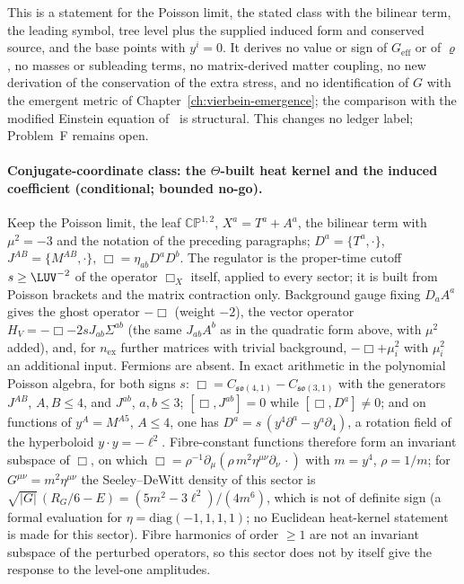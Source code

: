 This is a statement for the Poisson limit, the stated class with the bilinear term, the leading symbol, tree level plus the supplied induced form and conserved source, and the base points with \(y^i=0\). It derives no value or sign of \(G_{\mathrm{eff}}\) or of \(\varrho\), no masses or subleading terms, no matrix-derived matter coupling, no new derivation of the conservation of the extra stress, and no identification of \(G\) with the emergent metric of Chapter~\ref{ch:vierbein-emergence}; the comparison with the modified Einstein equation of~\cite{KumarSteinacker2023,Steinacker2026} is structural. This changes no ledger label; Problem~F remains open.

\paragraph{Conjugate-coordinate class: the \(\Theta\)-built heat kernel and the induced coefficient (conditional; bounded no-go).}
Keep the Poisson limit, the leaf \(\mathbb{CP}^{1,2}\), \(X^a=T^a+A^a\), the bilinear term with \(\mu^2=-3\) and the notation of the preceding paragraphs; \(D^a=\{T^a,\cdot\}\), \(J^{AB}=\{M^{AB},\cdot\}\), \(\Box=\eta_{ab}D^aD^b\). The regulator is the proper-time cutoff \(s\ge\LUV^{-2}\) of the operator \(\Box_X\) itself, applied to every sector; it is built from Poisson brackets and the matrix contraction only. Background gauge fixing \(D_aA^a\) gives the ghost operator \(-\Box\) (weight \(-2\)), the vector operator \(H_V=-\Box-2sJ_{ab}\Sigma^{ab}\) (the same \(J_{ab}A^b\) as in the quadratic form above, with \(\mu^2\) added), and, for \(n_{\mathrm{ex}}\) further matrices with trivial background, \(-\Box+\mu_i^2\) with \(\mu_i^2\) an additional input. Fermions are absent. In exact arithmetic in the polynomial Poisson algebra, for both signs \(s\): \(\Box=C_{\mathfrak{so}(4,1)}-C_{\mathfrak{so}(3,1)}\) with the generators \(J^{AB}\), \(A,B\le4\), and \(J^{ab}\), \(a,b\le3\); \([\Box,J^{ab}]=0\) while \([\Box,D^a]\ne0\); and on functions of \(y^A=M^{A5}\), \(A\le4\), one has \(D^a=s\,(y^4\partial^a-y^a\partial_4)\), a rotation field of the hyperboloid \(y\cdot y=-\ell^2\). Fibre-constant functions therefore form an invariant subspace of \(\Box\), on which \(\Box=\rho^{-1}\partial_\mu(\rho\,m^2\eta^{\mu\nu}\partial_\nu\,\cdot)\) with \(m=y^4\), \(\rho=1/m\); for \(G^{\mu\nu}=m^2\eta^{\mu\nu}\) the Seeley--DeWitt density of this sector is \(\sqrt{|G|}\,(R_G/6-E)=(5m^2-3\ell^2)/(4m^6)\), which is not of definite sign (a formal evaluation for \(\eta=\mathrm{diag}(-1,1,1,1)\); no Euclidean heat-kernel statement is made for this sector). Fibre harmonics of order \(\ge1\) are not an invariant subspace of the perturbed operators, so this sector does not by itself give the response to the level-one amplitudes.

